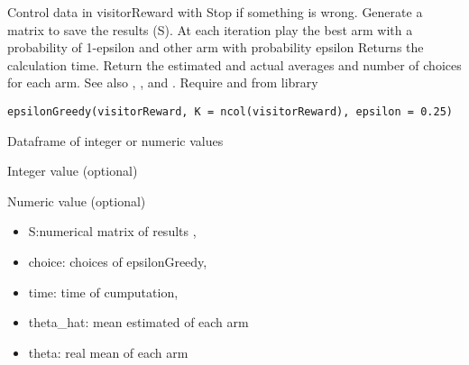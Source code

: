 \documentclass[letterpaper]{book}
\begin{document}
%
\begin{Description}\relax
Control data in visitorReward with 
Stop if something is wrong.
Generate a matrix to save the results (S).
At each iteration play the best arm with a probability of 1-epsilon and
other arm with probability epsilon
Returns the calculation time.
Return the estimated and actual averages and number of choices for each arm.
See also , ,
and .
Require  and  from  library
\end{Description}
%
\begin{Usage}
\begin{verbatim}
epsilonGreedy(visitorReward, K = ncol(visitorReward), epsilon = 0.25)
\end{verbatim}
\end{Usage}
%
\begin{Arguments}
\begin{ldescription}
\item[\code{visitorReward}] Dataframe of integer or numeric values

\item[\code{K}] Integer value (optional)

\item[\code{epsilon}] Numeric value (optional)
\end{ldescription}
\end{Arguments}
%
\begin{Value}
\begin{itemize}
 List of element:
\item S:numerical matrix of results ,
\item choice: choices of epsilonGreedy,
\item time: time of cumputation,
\item theta\_hat: mean estimated of each arm
\item theta: real mean of each arm

\end{itemize}

\end{Value}
%
\begin{Examples}
\end{Examples}
\end{document}
